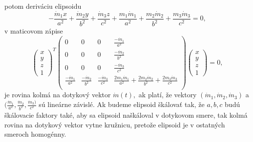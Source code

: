 potom deriváciu elipsoidu
$$
-\frac{\dot{m}_1x}{a^2} + \frac{\dot{m}_2y}{b^2} + \frac{\dot{m}_3z}{c^2} + \frac{m_1\dot{m}_1}{a^2} + \frac{m_2 \dot{m}_2}{b^2} + \frac{m_3 \dot{m}_3}{c^2} = 0,
$$
v maticovom zápise 
$$
\left(\begin{matrix} x \\ y \\ z  \\ 1
\end{matrix} \right)^T \left(\begin{matrix} 
0 & 0 & 0 & \frac{-\dot{m}_1}{a^2} \\
0 & 0 & 0 & \frac{-\dot{m}_2}{b^2} \\
0 & 0 & 0 & \frac{-\dot{m}_3}{c^2} \\
\frac{-\dot{m}_1}{a^2} & \frac{-\dot{m}_2}{b^2} & \frac{-\dot{m}_3}{c^2} & \frac{2m_1\dot{m}_1}{a^2} + \frac{2m_2 \dot{m}_2}{b^2} + \frac{2m_3 \dot{m}_3}{c^2}\\
\end{matrix} \right)\left(\begin{matrix} x \\ y \\ z \\ 1
\end{matrix} \right) = 0,
$$
je rovina kolmá na dotykový vektor $\dot{m}(t), $ ak platí, že vektory $(\dot{m}_1, \dot{m}_2, \dot{m}_3) $ a $(\frac{\dot{m}_1}{a^2}, \frac{\dot{m}_2}{b^2}, \frac{\dot{m}_3)}{c^2} $ sú lineárne závislé. Ak budeme elipsoid škálovať tak, že $a, b, c$ budú škálovacie faktory také, aby sa elipsoid naškáloval v dotykovom smere, tak kolmá rovina na dotykový vektor vytne kružnicu, pretože elipsoid je v ostatných smeroch homogénny.

